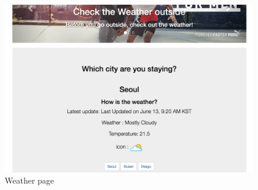 \documentclass[conference]{IEEEtran}
\begin{document}
\begin{figure}[H]
\begin{center}
    \includegraphics[scale=0.25]{capture5}
    \caption{Weather page} \label{fig:label}
\end{center}
\end{figure}
\end{document}
